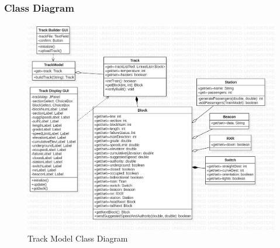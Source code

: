 \documentclass{article}
\begin{document}
    \subsubsection{Class Diagram}
    \begin{figure}[H]
        \centering
        \includegraphics[width=\textwidth]{./ClassDiagrams/TrackModel_ClassDiagram_pic.png}
        \caption{Track Model Class Diagram}
        \label{fig:Track Model Class Diagram}
    \end{figure}
    
\end{document}
